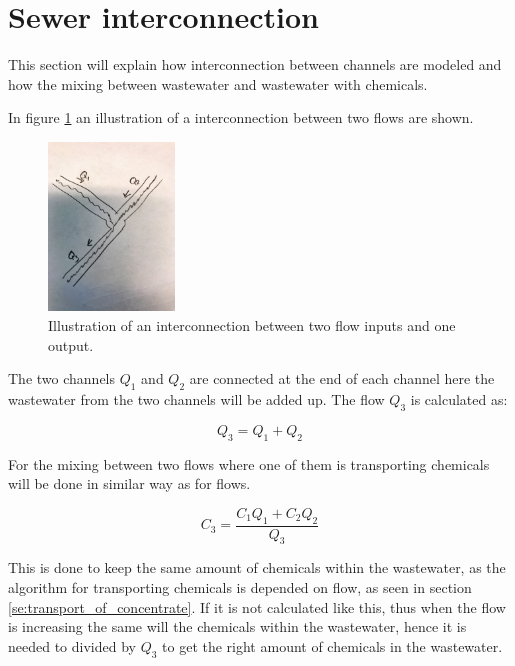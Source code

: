\section{Sewer interconnection}\label{se:sewer_interconnection}
This section will explain how interconnection between channels are modeled and how the mixing between wastewater and wastewater with chemicals.

In figure \ref{fig:interconnections} an illustration of a interconnection between two flows are shown.

\begin{figure}[H]
\centering
\includegraphics[width=0.30\textwidth]{report/modeling/pictures/interconnections.jpg}
\caption{Illustration of an interconnection between two flow inputs and one output.}
\label{fig:interconnections}
\end{figure} 

The two channels $Q_1$ and $Q_2$ are connected at the end of each channel here the wastewater from the two channels will be added up. The flow $Q_3$ is calculated as:

\begin{equation}
	Q_3 = Q_1 + Q_2 	
\end{equation} 

For the mixing between two flows where one of them is transporting chemicals will be done in similar way as for flows. 

\begin{equation}
	C_3 = \frac{C_1 Q_1 + C_2 Q_2}{Q_3}
\end{equation}

This is done to keep the same amount of chemicals within the wastewater, as the algorithm for transporting chemicals is depended on flow, as seen in section \ref{se:transport_of_concentrate}. If it is not calculated like this, thus when the flow is increasing the same will the chemicals within the wastewater, hence it is needed to divided by $Q_3$ to get the right amount of chemicals in the wastewater.  